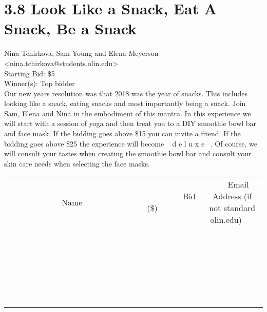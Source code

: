 \documentclass[11pt]{article}
\begin{document}
					\section*{3.8 Look Like a Snack, Eat A Snack, Be a Snack}
					Nina Tchirkova, Sam Young and Elena Meyerson <nina.tchirkova@students.olin.edu> \\
					Starting Bid: \$5 \\
					Winner(s): Top bidder \\
					Our new years resolution was that 2018 was the year of snacks. This includes looking like a snack, eating snacks and most importantly being a snack. Join Sam, Elena and Nina in the embodiment of this mantra. In this experience we will start with a session of yoga and then treat you to a DIY smoothie bowl bar and face mask. If the bidding goes above \$15 you can invite a friend. If the bidding goes above \$25 the experience will become ~ d e l u x e ~. Of course, we will consult your tastes when creating the smoothie bowl bar and consult your skin care needs when selecting the face masks. \\
					[6ex]
					\begin{tabular}{c c c}
						~~~~~~~~~~~~~Name~~~~~~~~~~~~~ & ~~~~~~~~~Bid (\$)~~~~~~~~~ & ~~~Email Address (if not standard olin.edu)~~~ \\
				
 & & \\
\hline
 & & \\
\hline
 & & \\
\hline
 & & \\
\hline
 & & \\
\hline
 & & \\
\hline
 & & \\
\hline
 & & \\
\hline
 & & \\
\hline
 & & \\
\hline
 & & \\
\hline
 & & \\
\hline
 & & \\
\hline
 & & \\
\hline
 & & \\
\hline
 & & \\
\hline
 & & \\
\hline
 & & \\
\hline
 & & \\
\hline
 & & \\
\hline
 & & \\
\hline
 & & \\
\hline
 & & \\
\hline
 & & \\
\hline
 & & \\
\hline
 & & \\
\hline
					\end{tabular}
					\clearpage
				
\end{document}
